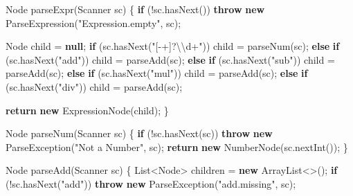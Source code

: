 \documentclass[
]{book}
\newenvironment{Shaded}{\begin{snugshade}}{\end{snugshade}}
\newcommand{\BuiltInTok}[1]{#1}
\newcommand{\FunctionTok}[1]{\textcolor[rgb]{0.00,0.00,0.00}{#1}}
\newcommand{\KeywordTok}[1]{\textcolor[rgb]{0.13,0.29,0.53}{\textbf{#1}}}
\newcommand{\NormalTok}[1]{#1}
\newcommand{\SpecialCharTok}[1]{\textcolor[rgb]{0.00,0.00,0.00}{#1}}
\newcommand{\StringTok}[1]{\textcolor[rgb]{0.31,0.60,0.02}{#1}}
\begin{document}
\begin{Shaded}
\begin{Highlighting}[]
\BuiltInTok{Node} \FunctionTok{parseExpr}\NormalTok{(}\BuiltInTok{Scanner}\NormalTok{ sc) \{}
  \KeywordTok{if}\NormalTok{ (!sc.}\FunctionTok{hasNext}\NormalTok{())}
    \KeywordTok{throw} \KeywordTok{new} \FunctionTok{ParseExpression}\NormalTok{(}\StringTok{"Expression.empty"}\NormalTok{, sc);}
  
  \BuiltInTok{Node}\NormalTok{ child = }\KeywordTok{null}\NormalTok{;}
  \KeywordTok{if}\NormalTok{ (sc.}\FunctionTok{hasNext}\NormalTok{(}\StringTok{"[{-}+]?}\SpecialCharTok{\textbackslash{}\textbackslash{}}\StringTok{d+"}\NormalTok{))}
\NormalTok{    child = }\FunctionTok{parseNum}\NormalTok{(sc);}
  \KeywordTok{else} \KeywordTok{if}\NormalTok{ (sc.}\FunctionTok{hasNext}\NormalTok{(}\StringTok{"add"}\NormalTok{))}
\NormalTok{    child = }\FunctionTok{parseAdd}\NormalTok{(sc);}
  \KeywordTok{else} \KeywordTok{if}\NormalTok{ (sc.}\FunctionTok{hasNext}\NormalTok{(}\StringTok{"sub"}\NormalTok{))}
\NormalTok{    child = }\FunctionTok{parseAdd}\NormalTok{(sc);}
  \KeywordTok{else} \KeywordTok{if}\NormalTok{ (sc.}\FunctionTok{hasNext}\NormalTok{(}\StringTok{"mul"}\NormalTok{))}
\NormalTok{    child = }\FunctionTok{parseAdd}\NormalTok{(sc);}
  \KeywordTok{else} \KeywordTok{if}\NormalTok{ (sc.}\FunctionTok{hasNext}\NormalTok{(}\StringTok{"div"}\NormalTok{))}
\NormalTok{    child = }\FunctionTok{parseAdd}\NormalTok{(sc);}
  
  \KeywordTok{return} \KeywordTok{new} \FunctionTok{ExpressionNode}\NormalTok{(child);}
\NormalTok{\}}

\BuiltInTok{Node} \FunctionTok{parseNum}\NormalTok{(}\BuiltInTok{Scanner}\NormalTok{ sc) \{}
  \KeywordTok{if}\NormalTok{ (!sc.}\FunctionTok{hasNext}\NormalTok{(sc)) }
    \KeywordTok{throw} \KeywordTok{new} \BuiltInTok{ParseException}\NormalTok{(}\StringTok{"Not a Number"}\NormalTok{, sc);}
  \KeywordTok{return} \KeywordTok{new} \FunctionTok{NumberNode}\NormalTok{(sc.}\FunctionTok{nextInt}\NormalTok{());}
\NormalTok{\}}

\BuiltInTok{Node} \FunctionTok{parseAdd}\NormalTok{(}\BuiltInTok{Scanner}\NormalTok{ sc) \{}
  \BuiltInTok{List}\NormalTok{\textless{}}\BuiltInTok{Node}\NormalTok{\textgreater{} children = }\KeywordTok{new} \BuiltInTok{ArrayList}\NormalTok{\textless{}\textgreater{}();}
  \KeywordTok{if}\NormalTok{ (!sc.}\FunctionTok{hasNext}\NormalTok{(}\StringTok{"add"}\NormalTok{))}
    \KeywordTok{throw} \KeywordTok{new} \BuiltInTok{ParseException}\NormalTok{(}\StringTok{"add.missing"}\NormalTok{, sc);}
  

\end{Highlighting}
\end{Shaded}
\end{document}
